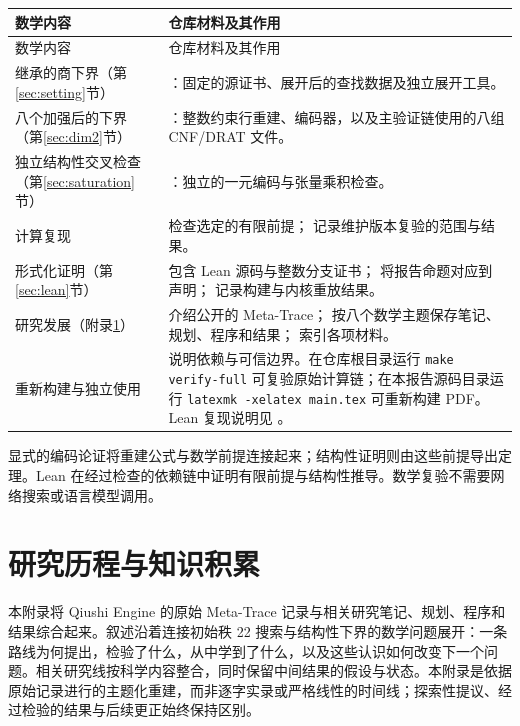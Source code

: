 \documentclass[11pt,a4paper]{article}
\begin{document}
\begin{longtable}{@{}L{4.8cm}L{9.8cm}@{}}
\toprule
数学内容&仓库材料及其作用\\
\midrule
\endfirsthead
\toprule 数学内容&仓库材料及其作用\\\midrule
\endhead
\bottomrule\endfoot
继承的商下界（第\ref{sec:setting}节）
&：固定的源证书、展开后的查找数据及独立展开工具。\\
八个加强后的下界（第\ref{sec:dim2}节）
&：整数约束行重建、编码器，以及主验证链使用的八组 CNF/DRAT 文件。\\
独立结构性交叉检查（第\ref{sec:saturation}节）
&：独立的一元编码与张量乘积检查。\\
计算复现
& 检查选定的有限前提； 记录维护版本复验的范围与结果。\\
形式化证明（第\ref{sec:lean}节）
& 包含 Lean 源码与整数分支证书； 将报告命题对应到声明； 记录构建与内核重放结果。\\
研究发展（附录\ref{app:research-record}）
& 介绍公开的 Meta-Trace； 按八个数学主题保存笔记、规划、程序和结果； 索引各项材料。\\
重新构建与独立使用
& 说明依赖与可信边界。在仓库根目录运行 \texttt{make verify-full} 可复验原始计算链；在本报告源码目录运行 \texttt{latexmk -xelatex main.tex} 可重新构建 PDF。Lean 复现说明见 。\\
\end{longtable}

显式的编码论证将重建公式与数学前提连接起来；结构性证明则由这些前提导出定理。Lean 在经过检查的依赖链中证明有限前提与结构性推导。数学复验不需要网络搜索或语言模型调用。

\FloatBarrier
\clearpage
\section{研究历程与知识积累}\label{app:research-record}

本附录将 Qiushi Engine 的原始 Meta-Trace 记录与相关研究笔记、规划、程序和结果综合起来。叙述沿着连接初始秩 22 搜索与结构性下界的数学问题展开：一条路线为何提出，检验了什么，从中学到了什么，以及这些认识如何改变下一个问题。相关研究线按科学内容整合，同时保留中间结果的假设与状态。本附录是依据原始记录进行的主题化重建，而非逐字实录或严格线性的时间线；探索性提议、经过检验的结果与后续更正始终保持区别。
\end{document}
